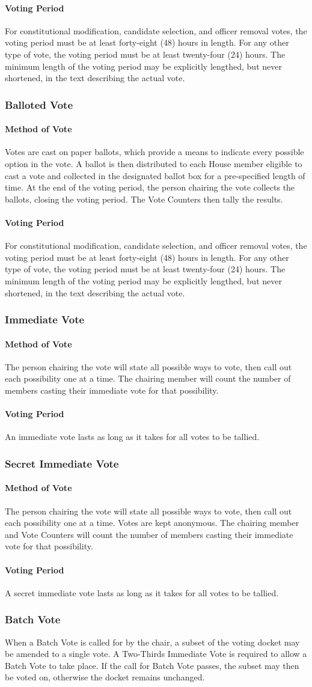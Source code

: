 \documentclass{article}
\newcommand{\asubsection}[1]{\subsubsection{#1} \label{#1}}
\newcommand{\asubsubsection}[1]{\paragraph{#1} \label{#1}}
\begin{document}
\asubsubsection{Voting Period} 
For constitutional modification, candidate selection, and officer removal votes, the voting period must be at least forty-eight (48) hours in length. For any other type of vote, the voting period must be at least twenty-four (24) hours. The minimum length of the voting period may be explicitly lengthed, but never shortened, in the text describing the actual vote.
\asubsection{Balloted Vote}
\asubsubsection{Method of Vote} 
Votes are cast on paper ballots, which provide a means to indicate every possible option in the vote.
A ballot is then distributed to each House member eligible to cast a vote and collected in the designated ballot box for a pre-specified length of time.
At the end of the voting period, the person chairing the vote collects the ballots, closing the voting period.
The Vote Counters then tally the results.
\asubsubsection{Voting Period} 
For constitutional modification, candidate selection, and officer removal votes, the voting period must be at least forty-eight (48) hours in length.
For any other type of vote, the voting period must be at least twenty-four (24) hours.
The minimum length of the voting period may be explicitly lengthed, but never shortened, in the text describing the actual vote.
\asubsection{Immediate Vote}
\asubsubsection{Method of Vote} 
The person chairing the vote will state all possible ways to vote, then call out each possibility one at a time.
The chairing member will count the number of members casting their immediate vote for that possibility.
\asubsubsection{Voting Period} 
An immediate vote lasts as long as it takes for all votes to be tallied.
\asubsection{Secret Immediate Vote}
\asubsubsection{Method of Vote} 
The person chairing the vote will state all possible ways to vote, then call out each possibility one at a time.
Votes are kept anonymous.
The chairing member and Vote Counters will count the number of members casting their immediate vote for that possibility.
\asubsubsection{Voting Period}
A secret immediate vote lasts as long as it takes for all votes to be tallied.
\asubsection{Batch Vote}
When a Batch Vote is called for by the chair, a subset of the voting docket may be amended to a single vote.
A Two-Thirds Immediate Vote is required to allow a Batch Vote to take place.
If the call for Batch Vote passes, the subset may then be voted on, otherwise the docket remains unchanged.
\end{document}
